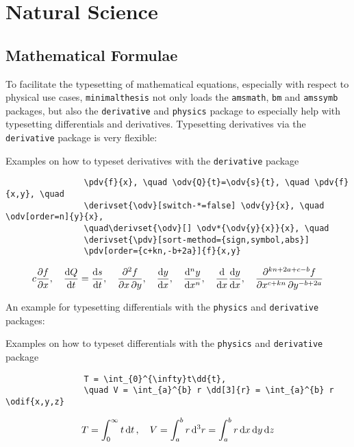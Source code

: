 \chapter{Natural Science}
	\section{Mathematical Formulae}
		To facilitate the typesetting of mathematical equations, especially with respect to physical use cases, \verb|minimalthesis| not only loads the \verb|amsmath|, \verb|bm| and \verb|amssymb| packages, but also the \verb|derivative| and \verb|physics| package to especially help with typesetting differentials and derivatives.
		\newline Typesetting derivatives via the \verb|derivative| package is very flexible: 
		\begin{table}[h!]
			\centering
			\caption{Examples on how to typeset derivatives with the \texttt{derivative} package}
			\begin{verbatim}
				\pdv{f}{x}, \quad \odv{Q}{t}=\odv{s}{t}, \quad \pdv{f}{x,y}, \quad 
				\derivset{\odv}[switch-*=false] \odv{y}{x}, \quad \odv[order=n]{y}{x}, 
				\quad\derivset{\odv}[] \odv*{\odv{y}{x}}{x}, \quad 
				\derivset{\pdv}[sort-method={sign,symbol,abs}] 
				\pdv[order={c+kn,-b+2a}]{f}{x,y}
			\end{verbatim}
			\begin{align*}{c}
				\pdv{f}{x}, \quad \odv{Q}{t}=\odv{s}{t}, \quad \pdv{f}{x,y}, \quad 
				\derivset{\odv}[switch-*=false] \odv{y}{x}, \quad \odv[order=n]{y}{x}, \quad
				\derivset{\odv}[] \odv*{\odv{y}{x}}{x}, \quad 
				\derivset{\pdv}[sort-method={sign,symbol,abs}] \pdv[order={c+kn,-b+2a}]{f}{x,y}
			\end{align*}
		\end{table}
		An example for typesetting differentials with the \verb|physics| and \verb|derivative| packages:
		\begin{table}[h!]
			\centering
			\caption{Examples on how to typeset differentials with the \texttt{physics} and \texttt{derivative} package}
			\begin{verbatim}
				T = \int_{0}^{\infty}t\dd{t}, 
				\quad V = \int_{a}^{b} r \dd[3]{r} = \int_{a}^{b} r \odif{x,y,z}
			\end{verbatim}
			\begin{align*}
				T = \int_{0}^{\infty}t\dd{t}, \quad V = \int_{a}^{b} r \dd[3]{r} = \int_{a}^{b} r \odif{x,y,z}
			\end{align*}
			
		\end{table}
	
